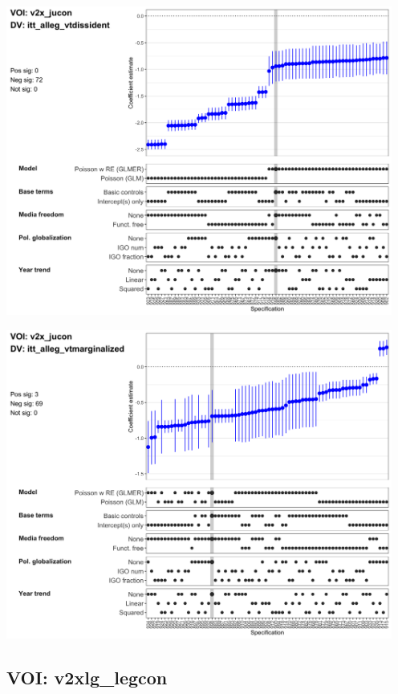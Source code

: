 \documentclass[]{article}
\begin{document}
\includegraphics[height=4in]{../output/figures-robustness/specplot-v2x_jucon-itt_alleg_vtdissident.png}

\includegraphics[height=4in]{../output/figures-robustness/specplot-v2x_jucon-itt_alleg_vtmarginalized.png}

\hypertarget{voi-v2xlg_legcon}{%
\subsection{VOI: v2xlg\_legcon}\label{voi-v2xlg_legcon}}
\end{document}
